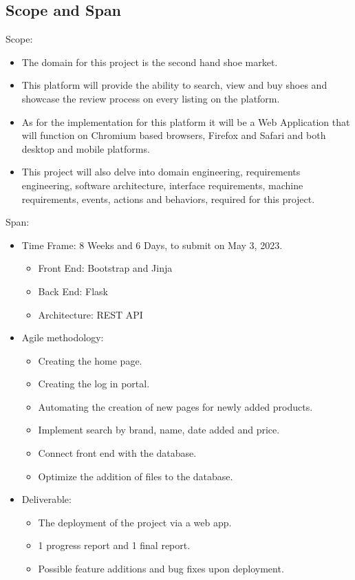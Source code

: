 \subsection{Scope and Span}
Scope:
\begin{itemize}
  \item The domain for this project is the second hand shoe market.
  \item This platform will provide the ability to search, view and buy shoes and showcase the review process on every listing on the platform.
  \item As for the implementation for this platform it will be a Web Application that will function on Chromium based browsers, Firefox and Safari and both desktop and mobile platforms.
        \item This project will also delve into domain engineering, requirements engineering, software architecture, interface requirements, machine requirements, events, actions and behaviors, required for this project.
\end{itemize}
Span:
\begin{itemize}
  \item Time Frame: 8 Weeks and 6 Days, to submit on May 3, 2023.
        \begin{itemize}
          \item Front End: Bootstrap and Jinja \cite{JinjaJinjaDocumentation}
          \item Back End: Flask\cite{WelcomeFlaskFlask}
          \item Architecture: REST API
        \end{itemize}
  \item Agile methodology:
        \begin{itemize}
          \item Creating the home page.
          \item Creating the log in portal.
          \item Automating the creation of new pages for newly added products.
          \item Implement search by brand, name, date added and price.
          \item Connect front end with the database.
          \item Optimize the addition of files to the database.
        \end{itemize}
  \item Deliverable:
        \begin{itemize}
          \item The deployment of the project via a web app.
          \item 1 progress report and 1 final report.
          \item Possible feature additions and bug fixes upon deployment.
        \end{itemize}
\end{itemize}
